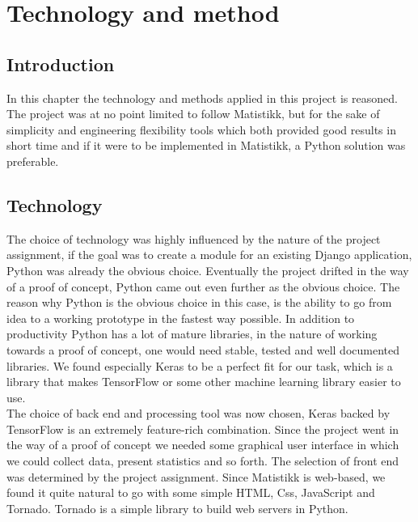 \chapter{Technology and method}

% 

\section{Introduction}
In this chapter the technology and methods applied in this project is reasoned. The project was at no point limited to follow Matistikk, but for the sake of simplicity and engineering flexibility tools which both provided good results in short time and if it were to be implemented in Matistikk, a Python solution was preferable.


\section{Technology}
The choice of technology was highly influenced by the nature of the project assignment, if the goal was to create a module for an existing Django application, Python was already the obvious choice. Eventually the project drifted in the way of a proof of concept, Python came out even further as the obvious choice. The reason why Python is the obvious choice in this case, is the ability to go from idea to a working prototype in the fastest way possible. In addition to productivity Python has a lot of mature libraries, in the nature of working towards a proof of concept, one would need stable, tested and well documented libraries. We found especially Keras \parencite{chollet_keras_2015} to be a perfect fit for our task, which is a library that makes TensorFlow or some other machine learning library easier to use.\\
\quad
The choice of back end and processing tool was now chosen, Keras backed by TensorFlow is an extremely feature-rich combination. Since the project went in the way of a proof of concept we needed some graphical user interface in which we could collect data, present statistics and so forth. The selection of front end was determined by the project assignment. Since Matistikk is web-based, we found it quite natural to go with some simple HTML, Css, JavaScript and Tornado. Tornado is a simple library to build web servers in Python.

